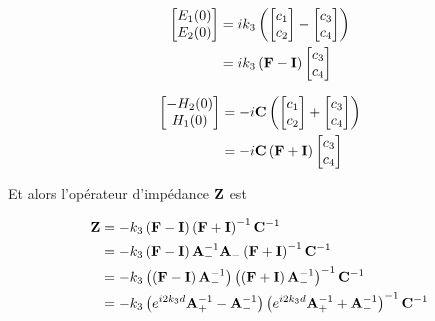 \begin{align}
    \begin{bmatrix}
        E_1(0)\\
        E_2(0)\\
    \end{bmatrix}
    &=ik_3\left(
    \begin{bmatrix}
        c_1 \\
        c_2
    \end{bmatrix}
    -
    \begin{bmatrix}
        c_3 \\
        c_4
    \end{bmatrix}
    \right)\\
    &=ik_3\left(\mathbf{F} - \mathbf{I} \right)
    \begin{bmatrix}
        c_3 \\
        c_4
    \end{bmatrix}
\end{align}

\begin{align}
    \begin{bmatrix}
        -H_2(0)\\
        H_1(0)\\
    \end{bmatrix}
    &=-i
    \mathbf{C}
    \left(
        \begin{bmatrix}
            c_1 \\
            c_2
        \end{bmatrix}
        +
        \begin{bmatrix}
            c_3 \\
            c_4
        \end{bmatrix}
    \right)
    \\
    &=-i\mathbf{C} \left(  \mathbf{F} + \mathbf{I}  \right)
    \begin{bmatrix}
            c_3 \\
            c_4
    \end{bmatrix}
\end{align}

Et alors l'opérateur d'impédance $\mathbf{Z}$ est

\begin{align}
    \mathbf{Z}
    &=-k_3\left(\mathbf{F} - \mathbf{I} \right)\left(\mathbf{F}+ \mathbf{I} \right)^{-1}\mathbf{C}^{-1}
    \\
    &=-k_3\left(\mathbf{F} - \mathbf{I} \right)\mathbf{A}_-^{-1}\mathbf{A}_-\left(\mathbf{F}+ \mathbf{I} \right)^{-1}\mathbf{C}^{-1}
    \\
    &=-k_3\left(\left(\mathbf{F} - \mathbf{I} \right)\mathbf{A}_-^{-1}\right)\left(\left(\mathbf{F}+ \mathbf{I} \right)\mathbf{A}_-^{-1}\right)^{-1}\mathbf{C}^{-1}
    \\
    &=-k_3\left( e^{i2 k_3 d} \mathbf{A}_+^{-1} -  \mathbf{A}_-^{-1} \right)
    \left( e^{i2 k_3 d} \mathbf{A}_+^{-1} + \mathbf{A}_-^{-1} \right)^{-1}\mathbf{C}^{-1}
\end{align}


